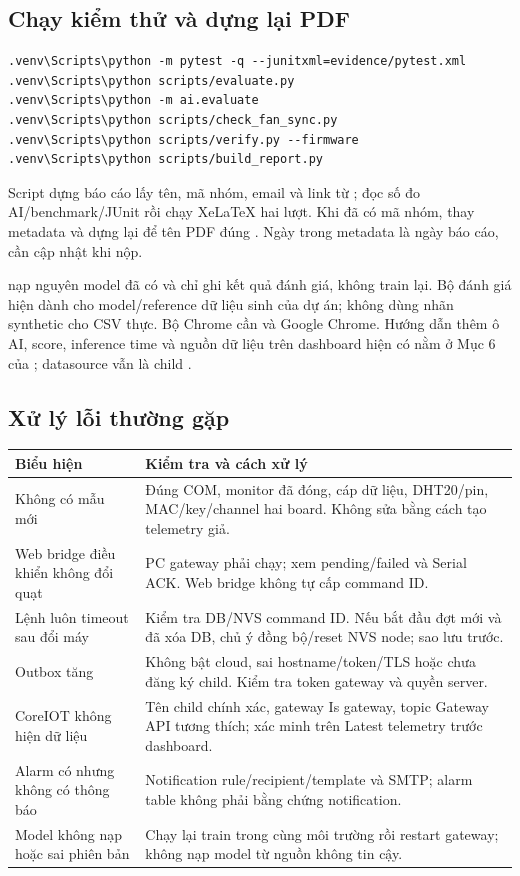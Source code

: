 \subsection{Chạy kiểm thử và dựng lại PDF}
\begin{verbatim}
.venv\Scripts\python -m pytest -q --junitxml=evidence/pytest.xml
.venv\Scripts\python scripts/evaluate.py
.venv\Scripts\python -m ai.evaluate
.venv\Scripts\python scripts/check_fan_sync.py
.venv\Scripts\python scripts/verify.py --firmware
.venv\Scripts\python scripts/build_report.py
\end{verbatim}
Script dựng báo cáo lấy tên, mã nhóm, email và link từ ; đọc số đo AI/benchmark/JUnit rồi chạy XeLaTeX hai lượt. Khi đã có mã nhóm, thay metadata và dựng lại để tên PDF đúng . Ngày trong metadata là ngày báo cáo, cần cập nhật khi nộp.

 nạp nguyên model đã có và chỉ ghi kết quả đánh giá, không train lại. Bộ đánh giá hiện dành cho model/reference dữ liệu sinh của dự án; không dùng nhãn synthetic cho CSV thực. Bộ Chrome cần  và Google Chrome. Hướng dẫn thêm ô AI, score, inference time và nguồn dữ liệu trên dashboard hiện có nằm ở Mục 6 của ; datasource vẫn là child .

\subsection{Xử lý lỗi thường gặp}
\begin{longtable}{P{4cm}P{10.8cm}}
\toprule Biểu hiện & Kiểm tra và cách xử lý \\ \midrule
Không có mẫu mới & Đúng COM, monitor đã đóng, cáp dữ liệu, DHT20/pin, MAC/key/channel hai board. Không sửa bằng cách tạo telemetry giả. \\
Web bridge điều khiển không đổi quạt & PC gateway phải chạy; xem pending/failed và Serial ACK. Web bridge không tự cấp command ID. \\
Lệnh luôn timeout sau đổi máy & Kiểm tra DB/NVS command ID. Nếu bắt đầu đợt mới và đã xóa DB, chủ ý đồng bộ/reset NVS node; sao lưu trước. \\
Outbox tăng & Không bật cloud, sai hostname/token/TLS hoặc chưa đăng ký child. Kiểm tra token gateway và quyền server. \\
CoreIOT không hiện dữ liệu & Tên child chính xác, gateway Is gateway, topic Gateway API tương thích; xác minh trên Latest telemetry trước dashboard. \\
Alarm có nhưng không có thông báo & Notification rule/recipient/template và SMTP; alarm table không phải bằng chứng notification. \\
Model không nạp hoặc sai phiên bản & Chạy lại train trong cùng môi trường rồi restart gateway; không nạp model từ nguồn không tin cậy. \\
\bottomrule
\end{longtable}
